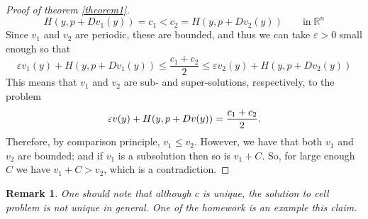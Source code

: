 \documentclass[12pt, oneside]{amsart}  	%
\newtheorem{remark}{Remark}
\begin{document}
\begin{proof}[Proof of theorem \ref{theorem1}]
\begin{equation*}
H(y,p+Dv_1(y)) = c_1 < c_2 = H(y,p+Dv_2(y)) \qquad\text{in}\;\mathbb{R}^n
\end{equation*}
Since $v_1$ and $v_2$ are periodic, these are bounded, and thus we can take $\varepsilon>0$ small enough so that
\begin{equation*}
\varepsilon v_1(y) + H(y,p+Dv_1(y)) \leq \frac{c_1+c_2}{2} \le\varepsilon v_2(y) + H(y,p+Dv_2(y)) 
\end{equation*}
This means that $v_1$ and $v_2$ are sub- and super-solutions, respectively, to the problem
$$ \varepsilon v(y)+ H(y, p+ Dv(y)) = \frac{c_1+c_2}{2}.$$
Therefore, by comparison principle, $v_1 \le v_2$. However, we have that both $v_1$ and $v_2$ are bounded; and if $v_1$ is a subsolution then so is $v_1+C$. So, for large enough $C$ we have $v_1+C > v_2$, which is a contradiction.
\end{proof}
\begin{remark}
	One should note that although $c$ is unique, the solution to cell problem is not unique in general. One of the homework is an example this claim.
\end{remark}
\end{document}
